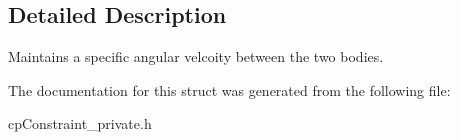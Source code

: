 \subsection{Detailed Description}
Maintains a specific angular velcoity between the two bodies. 

The documentation for this struct was generated from the following file\+:\begin{DoxyCompactItemize}
\item 
cp\+Constraint\+\_\+private.\+h\end{DoxyCompactItemize}
